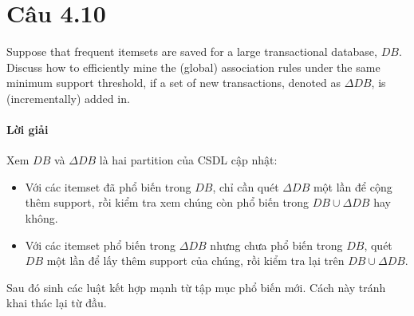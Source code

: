 \section{Câu 4.10}
Suppose that frequent itemsets are saved for a large transactional database, $DB$. Discuss how to efficiently mine the (global) association rules under the same minimum support threshold, if a set of new transactions, denoted as $\Delta DB$, is (incrementally) added in.

\paragraph{Lời giải}
Xem $DB$ và $\Delta DB$ là hai partition của CSDL cập nhật:
\begin{itemize}
    \item Với các itemset đã phổ biến trong $DB$, chỉ cần quét $\Delta DB$ một lần để cộng thêm support, rồi kiểm tra xem chúng còn phổ biến trong $DB \cup \Delta DB$ hay không.
    \item Với các itemset phổ biến trong $\Delta DB$ nhưng chưa phổ biến trong $DB$, quét $DB$ một lần để lấy thêm support của chúng, rồi kiểm tra lại trên $DB \cup \Delta DB$.
\end{itemize}

Sau đó sinh các luật kết hợp mạnh từ tập mục phổ biến mới. Cách này tránh khai thác lại từ đầu.
